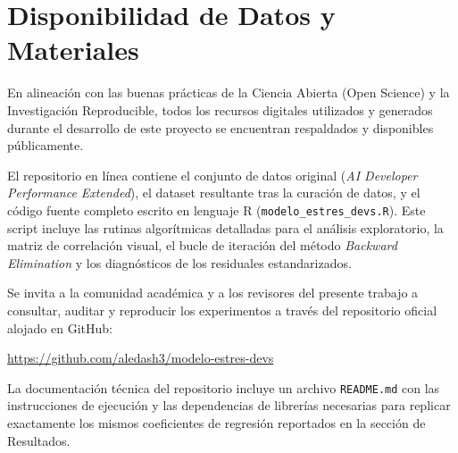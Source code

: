 \documentclass[conference]{IEEEtran}
\begin{document}
\section*{Disponibilidad de Datos y Materiales}

En alineación con las buenas prácticas de la Ciencia Abierta (Open Science) y la Investigación Reproducible, todos los recursos digitales utilizados y generados durante el desarrollo de este proyecto se encuentran respaldados y disponibles públicamente. 

El repositorio en línea contiene el conjunto de datos original (\textit{AI Developer Performance Extended}), el dataset resultante tras la curación de datos, y el código fuente completo escrito en lenguaje R (\texttt{modelo\_estres\_devs.R}). Este script incluye las rutinas algorítmicas detalladas para el análisis exploratorio, la matriz de correlación visual, el bucle de iteración del método \textit{Backward Elimination} y los diagnósticos de los residuales estandarizados. 

Se invita a la comunidad académica y a los revisores del presente trabajo a consultar, auditar y reproducir los experimentos a través del repositorio oficial alojado en GitHub: 

\begin{center}
\url{https://github.com/aledash3/modelo-estres-devs}
\end{center}

La documentación técnica del repositorio incluye un archivo \texttt{README.md} con las instrucciones de ejecución y las dependencias de librerías necesarias para replicar exactamente los mismos coeficientes de regresión reportados en la sección de Resultados.
\end{document}
